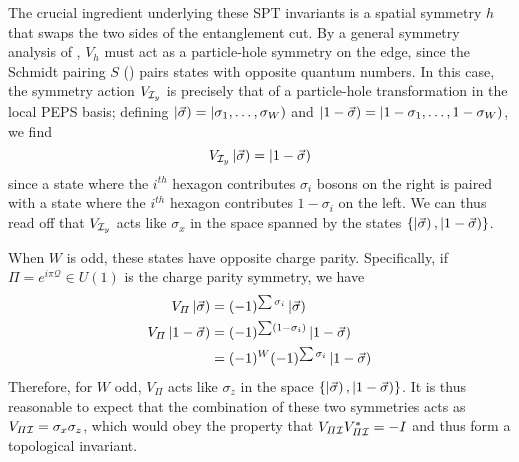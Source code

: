 The crucial ingredient underlying these SPT invariants is a spatial symmetry $h$ that swaps the 
two sides of the entanglement cut. 
By a general symmetry analysis of , $V_h$ must act as a 
particle-hole symmetry on the edge, since the Schmidt pairing $S$ () pairs states with
opposite quantum numbers. In this case, the symmetry action $V_{\mathcal{I}_y}$ is precisely
that of a particle-hole transformation in the local PEPS basis; defining $\left |\vec{\sigma} \right )=\left |\sigma_1,\ldots,\sigma_W \right )$
and $\left |1-\vec{\sigma} \right )=\left |1-\sigma_1,\ldots,1-\sigma_W \right )$, we find
\begin{equation}
V_{\mathcal{I}_y}\left |\vec{\sigma} \right ) = \left |1-\vec{\sigma} \right )
\end{equation}
since a state where the $i^{th}$ hexagon contributes $\sigma_i$ bosons on the right is paired with
a state where the $i^{th}$ hexagon contributes $1-\sigma_i$ on the left. We can thus read off
that $V_{\mathcal{I}_y}$ acts like $\sigma_x$ in the space spanned by the states
$\lbrace \left |\vec{\sigma} \right ), \left |1-\vec{\sigma} \right ) \rbrace$.

When $W$ is odd, these states have opposite charge parity. Specifically, if $\varPi = e^{i \pi \mathcal{Q}} \in U(1)$
is the charge parity symmetry, we have
\begin{align}
V_{\varPi} \left |\vec{\sigma} \right ) &= (-1)^{\sum \sigma_i} \left |\vec{\sigma} \right ) \\
V_{\varPi} \left |1-\vec{\sigma} \right ) &= (-1)^{\sum (1-\sigma_i) } \left |1-\vec{\sigma} \right ) \\ &= (-1)^W (-1)^{\sum \sigma_i} \left |1-\vec{\sigma} \right )
\end{align}
Therefore, for $W$ odd, $V_{\varPi}$ acts like $\sigma_z$ in the space $\lbrace \left |\vec{\sigma} \right ), \left |1-\vec{\sigma} \right ) \rbrace$.
It is thus reasonable to expect that the combination of these two symmetries acts as $V_{\varPi \mathcal{I}} = \sigma_x \sigma_z$,
which would obey the property that $V_{\varPi \mathcal{I}} V_{\varPi \mathcal{I}}^* = -I$ and thus form a topological invariant.

